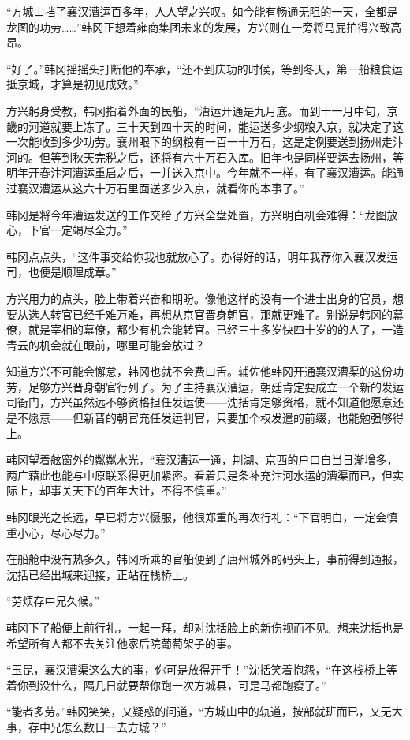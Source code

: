 “方城山挡了襄汉漕运百多年，人人望之兴叹。如今能有畅通无阻的一天，全都是龙图的功劳……”韩冈正想着雍商集团未来的发展，方兴则在一旁将马屁拍得兴致高昂。

“好了。”韩冈摇摇头打断他的奉承，“还不到庆功的时候，等到冬天，第一船粮食运抵京城，才算是初见成效。”

方兴躬身受教，韩冈指着外面的民船，“漕运开通是九月底。而到十一月中旬，京畿的河道就要上冻了。三十天到四十天的时间，能运送多少纲粮入京，就决定了这一次能收到多少功劳。襄州眼下的纲粮有一百一十万石，这是定例要送到扬州走汴河的。但等到秋天完税之后，还将有六十万石入库。旧年也是同样要运去扬州，等明年开春汴河漕运重启之后，一并送入京中。今年就不一样，有了襄汉漕运。能通过襄汉漕运从这六十万石里面送多少入京，就看你的本事了。”

韩冈是将今年漕运发送的工作交给了方兴全盘处置，方兴明白机会难得：“龙图放心，下官一定竭尽全力。”

韩冈点点头，“这件事交给你我也就放心了。办得好的话，明年我荐你入襄汉发运司，也便是顺理成章。”

方兴用力的点头，脸上带着兴奋和期盼。像他这样的没有一个进士出身的官员，想要从选人转官已经千难万难，再想从京官晋身朝官，那就更难了。别说是韩冈的幕僚，就是宰相的幕僚，都少有机会能转官。已经三十多岁快四十岁的的人了，一造青云的机会就在眼前，哪里可能会放过？

知道方兴不可能会懈怠，韩冈也就不会费口舌。辅佐他韩冈开通襄汉漕渠的这份功劳，足够方兴晋身朝官行列了。为了主持襄汉漕运，朝廷肯定要成立一个新的发运司衙门，方兴虽然远不够资格担任发运使——沈括肯定够资格，就不知道他愿意还是不愿意——但新晋的朝官充任发运判官，只要加个权发遣的前缀，也能勉强够得上。

韩冈望着舷窗外的粼粼水光，“襄汉漕运一通，荆湖、京西的户口自当日渐增多，两广藉此也能与中原联系得更加紧密。看着只是条补充汴河水运的漕渠而已，但实际上，却事关天下的百年大计，不得不慎重。”

韩冈眼光之长远，早已将方兴慑服，他很郑重的再次行礼：“下官明白，一定会慎重小心，尽心尽力。”

在船舱中没有热多久，韩冈所乘的官船便到了唐州城外的码头上，事前得到通报，沈括已经出城来迎接，正站在栈桥上。

“劳烦存中兄久候。”

韩冈下了船便上前行礼，一起一拜，却对沈括脸上的新伤视而不见。想来沈括也是希望所有人都不去关注他家后院葡萄架子的事。

“玉昆，襄汉漕渠这么大的事，你可是放得开手！”沈括笑着抱怨，“在这栈桥上等着你到没什么，隔几日就要帮你跑一次方城县，可是马都跑瘦了。”

“能者多劳。”韩冈笑笑，又疑惑的问道，“方城山中的轨道，按部就班而已，又无大事，存中兄怎么数日一去方城？”

